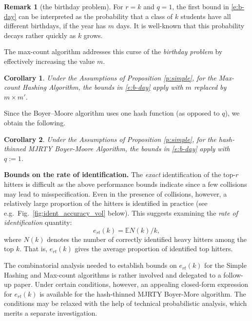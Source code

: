 \documentclass[10pt, conference, letterpaper,onecolumn]{IEEEtranv1.8}
\newcommand\E{\mathbb E}
\theoremstyle{plain}\newtheorem{thm}{Theorem}\newtheorem{lem}{Lemma}
\newtheorem{cor}{Corollary}
\theoremstyle{definition}
\newtheorem{rem}{Remark}
\def\HideProof#1{}
\begin{document}
\begin{rem}[the birthday problem] For $r=k$ and $q=1$, the first bound in \eqref{e:b-day} can be interpreted as
the probability that a class of $k$ students have all different birthdays, if the year has
$m$ days. It is well-known that this probability decays rather quickly as $k$ grows.
\end{rem}
The max-count algorithm addresses this curse of the {\em birthday problem} by effectively increasing the value 
$m$.

\begin{cor}
\label{cor:1}
 Under the Assumptions of Proposition \ref{p:simple}, for the Max-count Hashing Algorithm,
the bounds in \eqref{e:b-day} apply with $m$ replaced by $m\times m'$.
\end{cor}
\HideProof{\begin{proof}
The result follows by observing that hash-thinning with an independent uniform 
hash function $h_t$ taking $m'$ values leads to $m\times m'$ bins in \eqref{e:simple-1}.  
\end{proof}}

Since the Boyer--Moore algorithm uses one hash function (as opposed to $q$), 
we obtain the following.

\begin{cor}  Under the Assumptions of Proposition \ref{p:simple}, for the hash-thinned MJRTY Boyer-Moore
Algorithm, the bounds in \eqref{e:b-day} apply with $q:=1$.
\end{cor}

\smallskip
\noindent
{\bf Bounds on the rate of identification.} The {\em exact} identification of the top-$r$ hitters is difficult 
as the above performance bounds indicate since a few collisions may lead to misspecification. 
Even in the presence of collisions, however, a relatively large proportion of the hitters is identified 
in practice (see e.g.\ Fig.~\ref{fig:ident_accuracy_vol} below).  This suggests examining the 
{\em rate of identification} quantity:
\begin{equation}\label{e:e_r}
 e_{rt}(k) = \E N(k)/k,
\end{equation}
where $N(k)$ denotes the number of correctly identified heavy hitters among the top $k$. That is, $e_{rt}(k)$
gives the average proportion of identified top hitters.

The combinatorial analysis needed to establish bounds on $e_{rt}(k)$ for the
Simple Hashing and Max-count algorithms is rather involved and delegated to a follow-up paper. Under certain
conditions, however,  an appealing closed-form expression for $e_{rt}(k)$ is available for the hash-thinned MJRTY
Boyer-More algorithm. The conditions may be relaxed with the help of technical probabilistic analysis, which merits 
a separate investigation.
\end{document}
